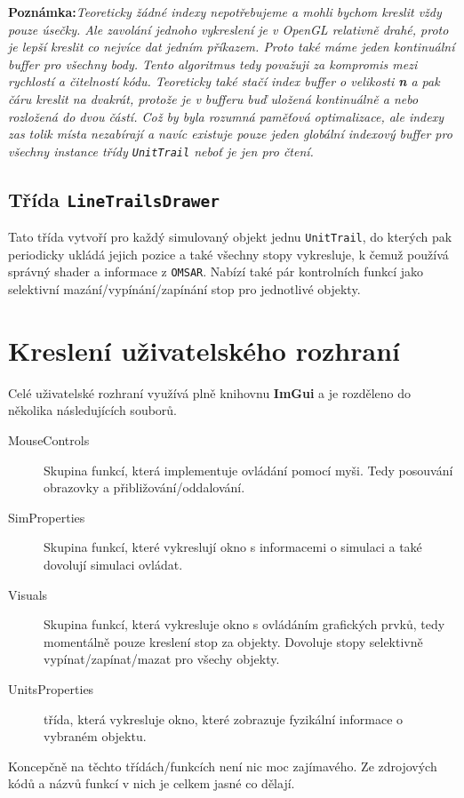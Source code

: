 \textbf{Poznámka:}\textit{Teoreticky žádné indexy nepotřebujeme a mohli bychom kreslit vždy pouze úsečky. Ale zavolání jednoho vykreslení je v OpenGL relativně drahé, proto je lepší kreslit co nejvíce dat jedním příkazem. Proto také máme jeden kontinuální buffer pro všechny body. Tento algoritmus tedy považuji za kompromis mezi rychlostí a čitelností kódu. Teoreticky také stačí index buffer o velikosti \textbf{n} a pak čáru kreslit na dvakrát, protože je v bufferu buď uložená kontinuálně a nebo rozložená do dvou částí. Což by byla rozumná paměťová optimalizace, ale indexy zas tolik místa nezabírají a navíc existuje pouze jeden globální indexový buffer pro všechny instance třídy \texttt{UnitTrail} neboť je jen pro čtení.}

\subsection{Třída \texttt{LineTrailsDrawer}}
Tato třída vytvoří pro každý simulovaný objekt jednu \texttt{UnitTrail}, do kterých pak periodicky ukládá jejich pozice a také všechny stopy vykresluje, k čemuž používá správný shader a informace z \texttt{OMSAR}. Nabízí také pár kontrolních funkcí jako selektivní mazání/vypínání/zapínání stop pro jednotlivé objekty.

\section{Kreslení uživatelského rozhraní}
Celé uživatelské rozhraní využívá plně knihovnu \textbf{ImGui} a je rozděleno do několika následujících souborů.
\begin{description}
	\item[MouseControls] Skupina funkcí, která implementuje ovládání pomocí myši. Tedy posouvání obrazovky a přibližování/oddalování.
	\item[SimProperties] Skupina funkcí, které vykreslují okno s informacemi o simulaci a také dovolují simulaci ovládat.
	\item[Visuals] Skupina funkcí, která vykresluje okno s ovládáním grafických prvků, tedy momentálně pouze kreslení stop za objekty. Dovoluje stopy selektivně vypínat/zapínat/mazat pro všechy objekty.
	\item[UnitsProperties] třída, která vykresluje okno, které zobrazuje fyzikální informace o vybraném objektu.
\end{description}
Koncepčně na těchto třídách/funkcích není nic moc zajímavého. Ze zdrojových kódů a názvů funkcí v nich je celkem jasné co dělají.
